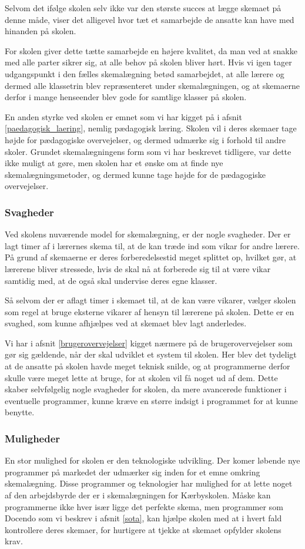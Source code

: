 Selvom det ifølge skolen selv ikke var den største succes at lægge skemaet på denne måde, viser det alligevel hvor tæt et samarbejde de ansatte kan have med hinanden på skolen.

For skolen giver dette tætte samarbejde en højere kvalitet, da man ved at snakke med alle parter sikrer sig, at alle behov på skolen bliver hørt. Hvis vi igen tager udgangspunkt i den fælles skemalægning betød samarbejdet, at alle lærere og dermed alle klassetrin blev repræsenteret under skemalægningen, og at skemaerne derfor i mange henseender blev gode for samtlige klasser på skolen. 

En anden styrke ved skolen er emnet som vi har kigget på i afsnit \ref{paedagogisk_laering}, nemlig pædagogisk læring. Skolen vil i deres skemaer tage højde for pædagogiske overvejelser, og dermed udmærke sig i forhold til andre skoler. Grundet skemalægningens form som vi har beskrevet tidligere, var dette ikke muligt at gøre, men skolen har et ønske om at finde nye skemalægningsmetoder, og dermed kunne tage højde for de pædagogiske overvejelser.

\subsubsection*{Svagheder}
Ved skolens nuværende model for skemalægning, er der nogle svagheder. Der er lagt timer af i lærernes skema til, at de kan træde ind som vikar for andre lærere. På grund af skemaerne er deres forberedelsestid meget splittet op, hvilket gør, at lærerene bliver stressede, hvis de skal nå at forberede sig til at være vikar samtidig med, at de også skal undervise deres egne klasser.

Så selvom der er aflagt timer i skemaet til, at de kan være vikarer, vælger skolen som regel at bruge eksterne vikarer af hensyn til lærerene på skolen. Dette er en svaghed, som kunne afhjælpes ved at skemaet blev lagt anderledes.

Vi har i afsnit \ref{brugerovervejelser} kigget nærmere på de brugerovervejelser som gør sig gældende, når der skal udviklet et system til skolen. Her blev det tydeligt at de ansatte på skolen havde meget teknisk snilde, og at programmerne derfor skulle være meget lette at bruge, for at skolen vil få noget ud af dem. Dette skaber selvfølgelig nogle svagheder for skolen, da mere avancerede funktioner i eventuelle programmer, kunne kræve en større indsigt i programmet for at kunne benytte.

\subsubsection*{Muligheder}
En stor mulighed for skolen er den teknologiske udvikling. Der komer løbende nye programmer på markedet der udmærker sig inden for et emne omkring skemalægning. Disse programmer og teknologier har mulighed for at lette noget af den arbejdsbyrde der er i skemalægningen for Kærbyskolen. Måske kan programmerne ikke hver især ligge det perfekte skema, men programmer som Docendo som vi beskrev i afsnit \ref{sota}, kan hjælpe skolen med at i hvert fald kontrollere deres skemaer, for hurtigere at tjekke at skemaet opfylder skolens krav.

